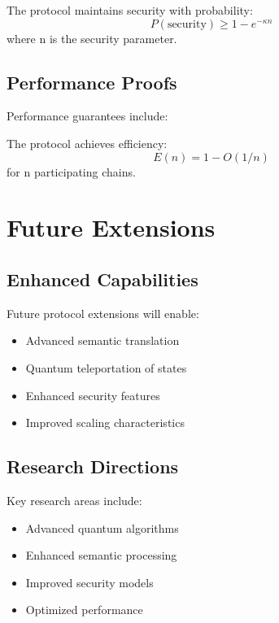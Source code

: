 \documentclass[12pt]{article}
\begin{document}
\begin{theorem}
The protocol maintains security with probability:
\begin{equation}
P(\text{security}) \geq 1 - e^{-\kappa n}
\end{equation}
where n is the security parameter.
\end{theorem}

\subsection{Performance Proofs}

Performance guarantees include:

\begin{theorem}
The protocol achieves efficiency:
\begin{equation}
E(n) = 1 - O(1/n)
\end{equation}
for n participating chains.
\end{theorem}

\section{Future Extensions}

\subsection{Enhanced Capabilities}

Future protocol extensions will enable:
\begin{itemize}
\item Advanced semantic translation
\item Quantum teleportation of states
\item Enhanced security features
\item Improved scaling characteristics
\end{itemize}

\subsection{Research Directions}

Key research areas include:
\begin{itemize}
\item Advanced quantum algorithms
\item Enhanced semantic processing
\item Improved security models
\item Optimized performance
\end{itemize}
\end{document}
